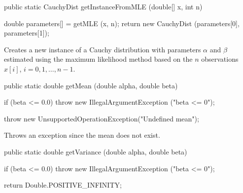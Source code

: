 \begin{htmlonly}
\end{htmlonly}
\begin{code}

   public static CauchyDist getInstanceFromMLE (double[] x, int n)\begin{hide} {
      double parameters[] = getMLE (x, n);
      return new CauchyDist (parameters[0], parameters[1]);
   }\end{hide}
\end{code}
\begin{tabb}
   Creates a new instance of a Cauchy distribution with parameters $\alpha$ and $\beta$
   estimated using the maximum likelihood method based on the $n$ observations
   $x[i]$, $i = 0, 1, \ldots, n-1$.
\end{tabb}
\begin{htmlonly}
\end{htmlonly}
\begin{code}

   public static double getMean (double alpha, double beta)\begin{hide} {
      if (beta <= 0.0)
         throw new IllegalArgumentException ("beta <= 0");

      throw new UnsupportedOperationException("Undefined mean");
   }\end{hide}
\end{code}
\begin{tabb} Throws an exception since the mean does not exist.
\end{tabb}
\begin{htmlonly}
\end{htmlonly}
\begin{code}

   public static double getVariance (double alpha, double beta)\begin{hide} {
      if (beta <= 0.0)
         throw new IllegalArgumentException ("beta <= 0");

      return Double.POSITIVE_INFINITY;
   }\end{hide}
\end{code}
